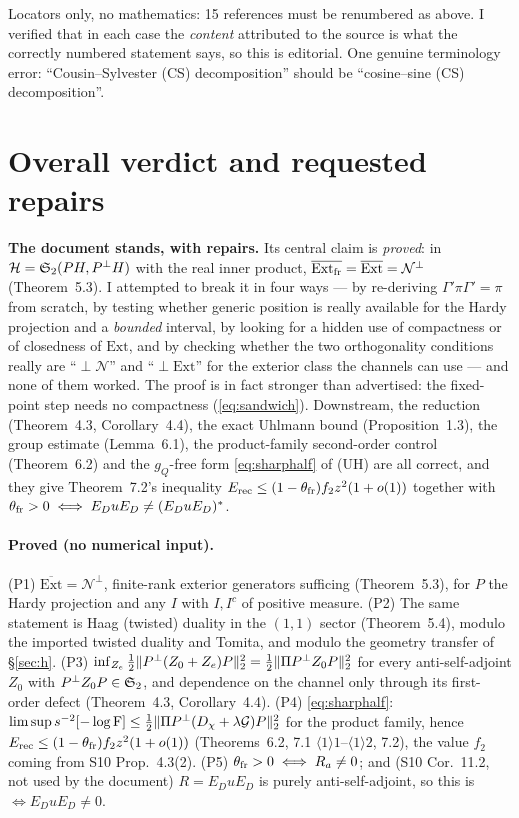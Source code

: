 \documentclass[11pt]{article}
\newcommand{\Stwo}{\mathfrak S_2}\newcommand{\Sone}{\mathfrak S_1}
\newcommand{\norm}[1]{\lVert #1\rVert}\newcommand{\abs}[1]{\lvert #1\rvert}
\newcommand{\Ext}{\mathrm{Ext}}\newcommand{\Nvis}{\mathcal N}
\newcommand{\Erec}{E_{\mathrm{rec}}}\newcommand{\Gs}{\mathcal G}
\begin{document}
\begin{verdictgap}
Locators only, no mathematics: 15 references must be renumbered as above.  I verified that
in each case the \emph{content} attributed to the source is what the correctly numbered
statement says, so this is editorial.  One genuine terminology error: ``Cousin--Sylvester
(CS) decomposition'' should be ``cosine--sine (CS) decomposition''.
\end{verdictgap}

\section{Overall verdict and requested repairs}\label{sec:verdict}

\begin{verdictok}
\textbf{The document stands, with repairs.}  Its central claim is \emph{proved}:
in $\cH=\Stwo(PH,\Pperp H)$ with the real inner product,
$\overline{\Ext_{\rm fr}}=\overline{\Ext}=\Nvis^{\perp}$ (Theorem~5.3).  I attempted to
break it in four ways --- by re-deriving $\Gamma'\pi\Gamma'=\pi$ from scratch, by testing
whether generic position is really available for the Hardy projection and a \emph{bounded}
interval, by looking for a hidden use of compactness or of closedness of $\Ext$, and by
checking whether the two orthogonality conditions really are ``$\perp\Nvis$'' and
``$\perp\Ext$'' for the exterior class the channels can use --- and none of them worked.
The proof is in fact stronger than advertised: the fixed-point step needs no compactness
(\eqref{eq:sandwich}).  Downstream, the reduction (Theorem~4.3, Corollary~4.4), the exact
Uhlmann bound (Proposition~1.3), the group estimate (Lemma~6.1), the product-family
second-order control (Theorem~6.2) and the $g_Q$-free form \eqref{eq:sharphalf} of (UH) are
all correct, and they give Theorem~7.2's inequality
$\Erec\le(1-\theta_{\rm fr})f_2z^2(1+o(1))$ together with
$\theta_{\rm fr}>0\iff E_DuE_D\ne(E_DuE_D)^*$.
\end{verdictok}

\paragraph{Proved (no numerical input).}
(P1) $\overline{\Ext}=\Nvis^{\perp}$, finite-rank exterior generators sufficing
(Theorem~5.3), for $P$ the Hardy projection and any $I$ with $I,I^c$ of positive measure.
(P2) The same statement is Haag (twisted) duality in the $(1,1)$ sector (Theorem~5.4),
modulo the imported twisted duality and Tomita, and modulo the geometry transfer of
\S\ref{sec:h}.
(P3) $\inf_{Z_e}\tfrac12\norm{\Pperp(Z_0+Z_e)P}_2^2=\tfrac12\norm{\Pi\Pperp Z_0P}_2^2$ for
every anti-self-adjoint $Z_0$ with $\Pperp Z_0P\in\Stwo$, and dependence on the channel only
through its first-order defect (Theorem~4.3, Corollary~4.4).
(P4) \eqref{eq:sharphalf}: $\limsup s^{-2}[-\log\mathrm F]\le\tfrac12\norm{\Pi\Pperp(D_\chi+\lambda\Gs)P}_2^2$
for the product family, hence $\Erec\le(1-\theta_{\rm fr})f_2z^2(1+o(1))$ (Theorems~6.2, 7.1
$\langle1\rangle1$--$\langle1\rangle2$, 7.2), the value $f_2$ coming from S10 Prop.~4.3(2).
(P5) $\theta_{\rm fr}>0\iff R_a\ne0$; and (S10 Cor.~11.2, not used by the document)
$R=E_DuE_D$ is purely anti-self-adjoint, so this is $\iff E_DuE_D\ne0$.
\end{document}
